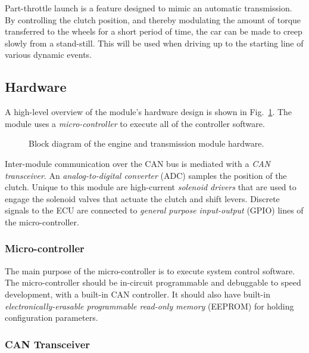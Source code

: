 Part-throttle launch is a feature designed to mimic an automatic transmission. By controlling the clutch position, and thereby modulating the amount of torque transferred to the wheels for a short period of time, the car can be made to creep slowly from a stand-still. This will be used when driving up to the starting line of various dynamic events.

\subsection{Hardware \label{sec:design_engine_transmission_hardware}}

A high-level overview of the module's hardware design is shown in Fig.\ \ref{fig:engine_hardware_design_block}. The module uses a \emph{micro-controller} to execute all of the controller software. 

\begin{figure}[H]
	\centering
	
	\caption{Block diagram of the engine and transmission module hardware.}
	\label{fig:engine_hardware_design_block}
\end{figure}


Inter-module communication over the CAN bus is mediated with a \emph{CAN transceiver}. An \emph{analog-to-digital converter} (ADC) samples the position of the clutch. Unique to this module are high-current \emph{solenoid drivers} that are used to engage the solenoid valves that actuate the clutch and shift levers. Discrete signals to the ECU are connected to \emph{general purpose input-output} (GPIO) lines of the micro-controller.

\subsubsection{Micro-controller}


The main purpose of the micro-controller is to execute system control software. The micro-controller should be in-circuit programmable and debuggable to speed development, with a built-in CAN controller. It should also have built-in \emph{electronically-erasable programmable read-only memory} (EEPROM) for holding configuration parameters.

\subsubsection{CAN Transceiver}

